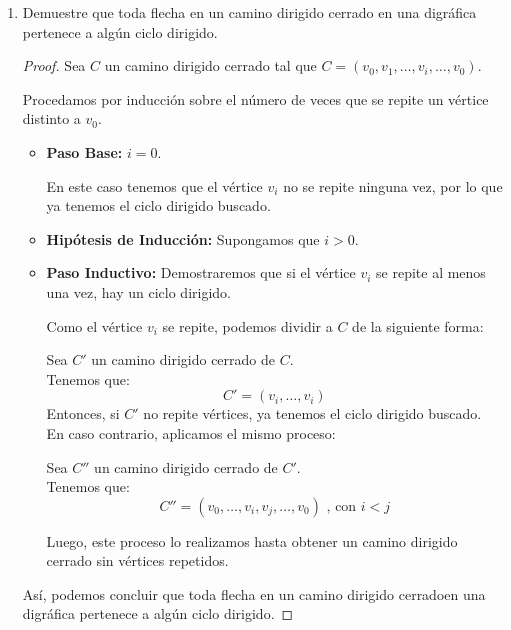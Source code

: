 \documentclass{article}
\begin{document}
\begin{enumerate}
  \small
\item Demuestre que toda flecha en un camino dirigido cerrado en una digr\'afica
  pertenece a alg\'un ciclo dirigido.
  \renewcommand\qedsymbol{QED}
  \begin{proof}
    Sea $C$ un camino dirigido cerrado tal que $C = (v_{0}, v_{1}, \dots, v_{i},
    \dots, v_{0})$.
    
    Procedamos por inducción sobre el número de veces que se repite un vértice
    distinto a $v_{0}$.

    \begin{itemize}
      \item \textbf{Paso Base:} $i = 0$.

        En este caso tenemos que el vértice $v_{i}$ no se repite ninguna vez, por
        lo que ya tenemos el ciclo dirigido buscado.

      \item \textbf{Hipótesis de Inducción:} Supongamos que $i > 0$.

      \item \textbf{Paso Inductivo:} Demostraremos que si el vértice $v_{i}$ se
      repite al menos una vez, hay un ciclo dirigido.

        Como el vértice $v_{i}$ se repite, podemos dividir a $C$ de la siguiente forma:

        Sea $C'$ un camino dirigido cerrado de $C$. \\
        Tenemos que:
        $$C' = (v_{i}, \dots, v_{i})$$
        Entonces, si $C'$ no repite vértices, ya tenemos el ciclo dirigido buscado. \\
        En caso contrario, aplicamos el mismo proceso:

        Sea $C''$ un camino dirigido cerrado de $C'$. \\
        Tenemos que:
        $$C'' = (v_{0}, \dots, v_{i}, v_{j}, \dots, v_{0}) \text{ , con $i < j$}$$

        Luego, este proceso lo realizamos hasta obtener un camino dirigido cerrado
        sin vértices repetidos.
    \end{itemize}
    Así, podemos concluir que toda flecha en un camino dirigido cerradoen una digráfica
    pertenece a algún ciclo dirigido.
  \end{proof}


\end{enumerate}
\end{document}
